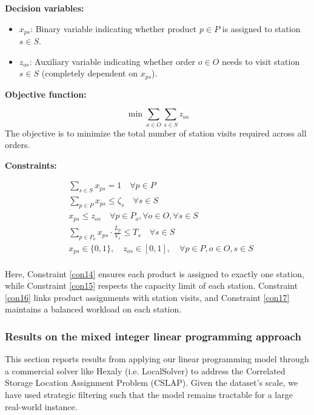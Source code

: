 \documentclass[11pt]{elsarticle}
\begin{document}

\noindent \textbf{Decision variables:}
\begin{itemize}
    \item $x_{ps}$: Binary variable indicating whether product $p \in P$ is assigned to station $s \in S$.
    \item $z_{os}$: Auxiliary variable indicating whether order $o \in O$ needs to visit station $s \in S$ (completely dependent on $x_{ps}$). 

\end{itemize}

\noindent \textbf{Objective function:}

\begin{equation}
\min \sum_{o \in O} \sum_{s \in S} z_{os}
\label{obj}
\end{equation}
The objective is to minimize the total number of station visits required across all orders.

\noindent \textbf{Constraints:}

\begin{align}
&\sum_{s \in S} x_{ps} = 1 \quad \forall p \in P \label{con14}\\
&\sum_{p \in P} x_{ps} \leq \zeta_s \quad \forall s \in S \label{con15}\\
&x_{ps} \leq z_{os} \quad \forall p \in P_o, \forall o \in O, \forall s \in S \label{con16}\\
&\sum_{p \in P_o} x_{ps} \cdot \frac{L_p}{V_s} \leq T_s \quad \forall s \in S \label{con17}\\
&x_{ps} \in \{0, 1\}, \quad z_{os} \in [0,1], \quad \forall p \in P, o \in O, s \in S 
\end{align}
\\
\noindent Here, Constraint \eqref{con14} ensures each product is assigned to exactly one station, while Constraint \eqref{con15} respects the capacity limit of each station. Constraint \eqref{con16} links product assignments with station visits, and Constraint \eqref{con17} maintains a balanced workload on each station.

\subsubsection{Results on the mixed integer linear programming approach}
This section reports results from applying our linear programming model through a commercial solver like Hexaly (i.e. LocalSolver) to address the Correlated Storage Location Assignment Problem (CSLAP). Given the dataset’s scale, we have used strategic filtering such that the model remains tractable for a large real-world instance.
\end{document}
